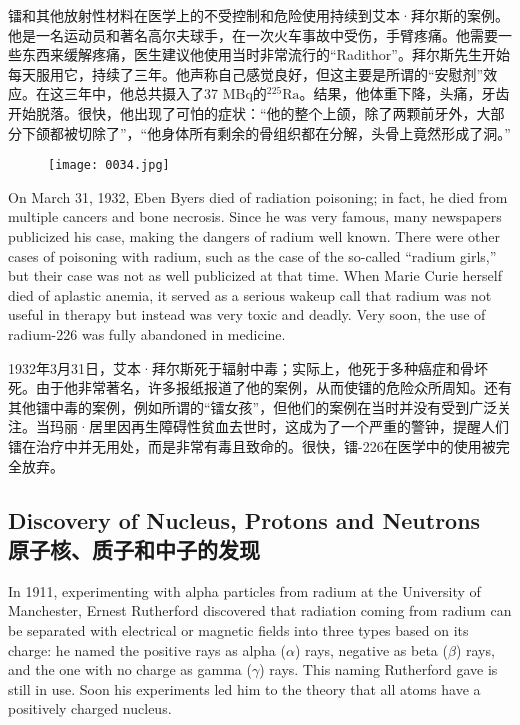 \documentclass[dvipsnames, svgnames,a4paper,11pt]{article}
\begin{document}
镭和其他放射性材料在医学上的不受控制和危险使用持续到艾本·拜尔斯的案例。他是一名运动员和著名高尔夫球手，在一次火车事故中受伤，手臂疼痛。他需要一些东西来缓解疼痛，医生建议他使用当时非常流行的“Radithor”。拜尔斯先生开始每天服用它，持续了三年。他声称自己感觉良好，但这主要是所谓的“安慰剂”效应。在这三年中，他总共摄入了37 MBq的\(\mathrm{^{225}Ra}\)。结果，他体重下降，头痛，牙齿开始脱落。很快，他出现了可怕的症状：“他的整个上颌，除了两颗前牙外，大部分下颌都被切除了”，“他身体所有剩余的骨组织都在分解，头骨上竟然形成了洞。”

\begin{figure}[htbp]
      \centering
      \texttt{[image: 0034.jpg]}
       \label{fig22}
\end{figure}

On March 31, 1932, Eben Byers died of radiation poisoning; in fact, he died from multiple cancers and bone necrosis. Since he was very famous, many newspapers publicized his case, making the dangers of radium well known. There were other cases of poisoning with radium, such as the case of the so-called “radium girls,” but their case was not as well publicized at that time. When Marie Curie herself died of aplastic anemia, it served as a serious wakeup call that radium was not useful in therapy but instead was very toxic and deadly. Very soon, the use of radium-226 was fully abandoned in medicine.

1932年3月31日，艾本·拜尔斯死于辐射中毒；实际上，他死于多种癌症和骨坏死。由于他非常著名，许多报纸报道了他的案例，从而使镭的危险众所周知。还有其他镭中毒的案例，例如所谓的“镭女孩”，但他们的案例在当时并没有受到广泛关注。当玛丽·居里因再生障碍性贫血去世时，这成为了一个严重的警钟，提醒人们镭在治疗中并无用处，而是非常有毒且致命的。很快，镭-226在医学中的使用被完全放弃。

\subsection{Discovery of Nucleus, Protons and Neutrons\\原子核、质子和中子的发现}

In 1911, experimenting with alpha particles from radium at the University of Manchester, Ernest Rutherford discovered that radiation coming from radium can be separated with electrical or magnetic fields into three types based on its charge: he named the positive rays as alpha ($\alpha$) rays, negative as beta ($\beta$) rays, and the one with no charge as gamma ($\gamma$) rays. This naming Rutherford gave is still in use. Soon his experiments led him to the theory that all atoms have a positively charged nucleus.
\end{document}
